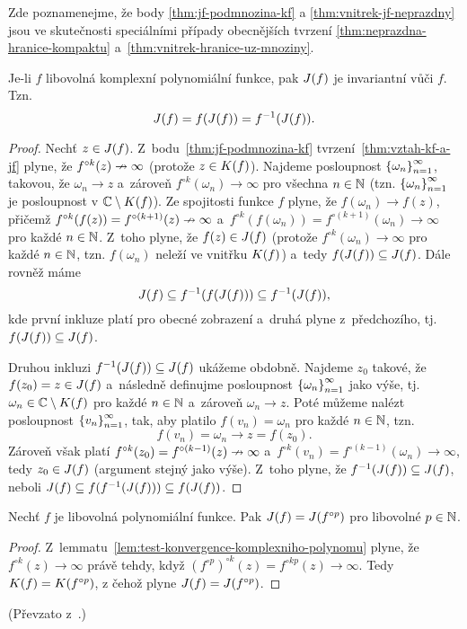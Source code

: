 Zde poznamenejme, že body \ref{thm:jf-podmnozina-kf} a \ref{thm:vnitrek-jf-neprazdny} jsou ve skutečnosti speciálními případy obecnějších tvrzení \ref{thm:neprazdna-hranice-kompaktu} a~\ref{thm:vnitrek-hranice-uz-mnoziny}.
\begin{theorem}\label{invariance-jf}
    Je-li $f$ libovolná komplexní polynomiální funkce, pak $J(f)$ je invariantní vůči $f$. Tzn.
    \[J(f)=f(J(f))=f^{-1}(J(f)).\]
\end{theorem}
\begin{proof}
    Nechť $z\in J(f)$. Z~bodu~\ref{thm:jf-podmnozina-kf} tvrzení~\ref{thm:vztah-kf-a-jf} plyne, že $f^{\circ k}(z)\nrightarrow\infty$ (protože $z\in K(f)$). Najdeme posloupnost $\left\{\omega_n\right\}_{n=1}^\infty$, takovou, že $\omega_n\to z$ a~zároveň $f^{\circ k}(\omega_n)\to\infty$ pro všechna $n\in\mathbb{N}$ (tzn. $\left\{\omega_n\right\}_{n=1}^\infty$ je posloupnost v $\mathbb{C}\setminus K(f)$). Ze spojitosti funkce $f$ plyne, že $f(\omega_n)\to f(z)$, přičemž $f^{\circ k}(f(z))=f^{\circ(k+1)}(z)\nrightarrow\infty$ a~$f^{\circ k}(f(\omega_n))=f^{\circ(k+1)}(\omega_n)\to\infty$ pro každé $n\in\mathbb{N}$. Z~toho plyne, že $f(z)\in J(f)$ (protože $f^{\circ k}(\omega_n)\to\infty$ pro každé $n\in\mathbb{N}$, tzn. $f(\omega_n)$ neleží ve vnitřku $K(f)$) a~tedy $f(J(f))\subseteq J(f)$. Dále rovněž máme
    \[J(f)\subseteq f^{-1}(f(J(f)))\subseteq f^{-1}(J(f)),\]
    kde první inkluze platí pro obecné zobrazení a~druhá plyne z~předchozího, tj. $f(J(f))\subseteq J(f)$.

    Druhou inkluzi $f^{-1}(J(f))\subseteq J(f)$ ukážeme obdobně. Najdeme $z_0$ takové, že $f(z_0)=z\in J(f)$ a~následně definujme posloupnost $\left\{\omega_n\right\}_{n=1}^\infty$ jako výše, tj. $\omega_n\in\mathbb{C}\setminus K(f)$ pro každé $n\in\mathbb{N}$ a~zároveň $\omega_n\to z$. Poté můžeme nalézt posloupnost $\left\{v_n\right\}_{n=1}^\infty$, tak, aby platilo $f(v_n)=\omega_n$ pro každé $n\in\mathbb{N}$, tzn.
    \[f(v_n)=\omega_n\to z=f(z_0).\]
    Zároveň však platí $f^{\circ k}(z_0)=f^{\circ(k-1)}(z)\nrightarrow\infty$ a~$f^{\circ k}(v_n)=f^{\circ(k-1)}(\omega_n)\to\infty$, tedy $z_0\in J(f)$ (argument stejný jako výše). Z~toho plyne, že $f^{-1}(J(f))\subseteq J(f)$, neboli $J(f)\subseteq f(f^{-1}(J(f)))\subseteq f(J(f))$.
\end{proof}
\begin{theorem}\label{ekvivalence-jf-a-jfp}
    Nechť $f$ je libovolná polynomiální funkce. Pak $J(f)=J(f^{\circ p})$ pro libovolné $p\in\mathbb{N}$.
\end{theorem}
\begin{proof}
    Z~lemmatu~\ref{lem:test-konvergence-komplexniho-polynomu} plyne, že $f^{\circ k}(z)\to\infty$ právě tehdy, když $(f^{\circ p})^{\circ k}(z)=f^{\circ kp}(z)\to\infty$. Tedy $K(f)=K(f^{\circ p})$, z čehož plyne $J(f)=J(f^{\circ p})$.
\end{proof}
(Převzato z~\citep[str. 238]{Falconer1989}.)

